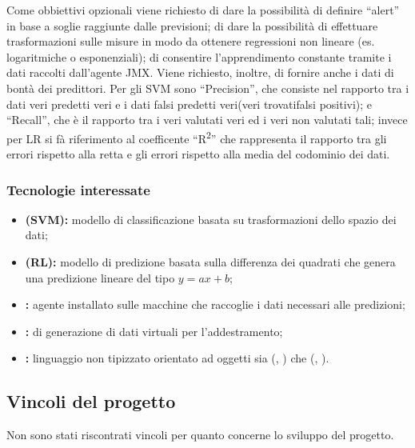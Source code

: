 			Come obbiettivi opzionali viene richiesto di dare la possibilità di definire ``alert'' in base a soglie raggiunte dalle previsioni; di dare la possibilità di effettuare trasformazioni sulle misure in modo da ottenere regressioni non lineare (es. logaritmiche o esponenziali); di consentire l'apprendimento constante tramite i dati raccolti dall'agente JMX. Viene richiesto, inoltre, di fornire anche i dati di bontà dei predittori. Per gli SVM sono ``Precision'', che consiste nel rapporto tra i dati veri predetti veri e i dati falsi predetti veri(veri trovati\/falsi positivi); e ``Recall'', che è il rapporto tra i veri valutati veri ed i veri non valutati tali; invece per LR si fà riferimento al coefficente ``R\textsuperscript{2}'' che rappresenta il rapporto tra gli errori rispetto alla retta e gli errori rispetto alla media del codominio dei dati.


		\subsubsection{Tecnologie interessate}
			\begin{itemize}
			  \item \textbf{ (SVM):} modello di classificazione basata su trasformazioni dello spazio dei dati;
			  \item \textbf{ (RL):} modello di predizione basata sulla differenza dei quadrati che genera una predizione lineare del tipo \(y=ax+b\);
				\item \textbf{:} agente installato sulle macchine che raccoglie i dati necessari alle predizioni;
				\item \textbf{:}  di generazione di dati virtuali per l'addestramento;
			  \item \textbf{:} linguaggio non tipizzato orientato ad oggetti sia  (, ) che  (, ).
			\end{itemize}

		\subsection{Vincoli del progetto}
			Non sono stati riscontrati vincoli per quanto concerne lo sviluppo del progetto.


